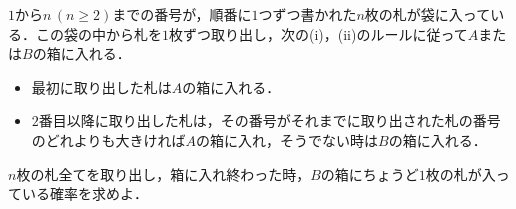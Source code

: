 $1$から$n\, (n\ge 2)$までの番号が，順番に$1$つずつ書かれた$n$枚の札が袋に入っている．この袋の中から札を$1$枚ずつ取り出し，次の(i)，(ii)のルールに従って$A$または$B$の箱に入れる．
\begin{itemize}
  \item[(i)] 最初に取り出した札は$A$の箱に入れる．
  \item[(ii)] $2$番目以降に取り出した札は，その番号がそれまでに取り出された札の番号のどれよりも大きければ$A$の箱に入れ，そうでない時は$B$の箱に入れる．
\end{itemize}

$n$枚の札全てを取り出し，箱に入れ終わった時，$B$の箱にちょうど$1$枚の札が入っている確率を求めよ．
